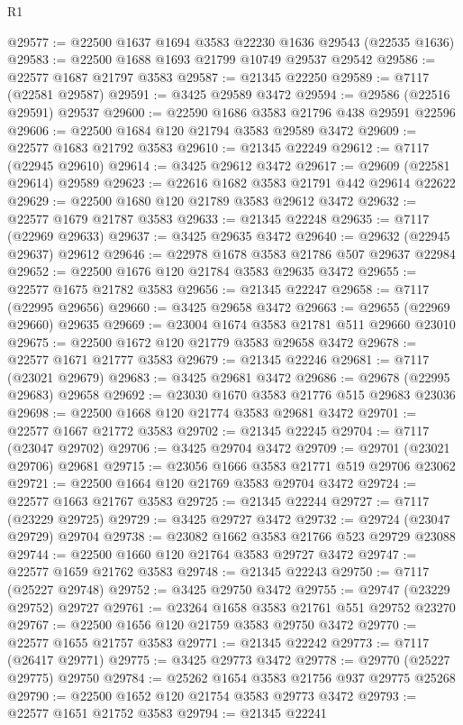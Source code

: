\begin{lexlean}{R1}
\begin{coremodule}
@29577 := @22500 @1637 @1694 @3583 @22230 @1636 @29543 (@22535 @1636)
@29583 := @22500 @1688 @1693 @21799 @10749 @29537 @29542
@29586 := @22577 @1687 @21797 @3583
@29587 := @21345 @22250
@29589 := @7117 (@22581 @29587)
@29591 := @3425 @29589 @3472
@29594 := @29586 (@22516 @29591) @29537
@29600 := @22590 @1686 @3583 @21796 @438 @29591 @22596
@29606 := @22500 @1684 @120 @21794 @3583 @29589 @3472
@29609 := @22577 @1683 @21792 @3583
@29610 := @21345 @22249
@29612 := @7117 (@22945 @29610)
@29614 := @3425 @29612 @3472
@29617 := @29609 (@22581 @29614) @29589
@29623 := @22616 @1682 @3583 @21791 @442 @29614 @22622
@29629 := @22500 @1680 @120 @21789 @3583 @29612 @3472
@29632 := @22577 @1679 @21787 @3583
@29633 := @21345 @22248
@29635 := @7117 (@22969 @29633)
@29637 := @3425 @29635 @3472
@29640 := @29632 (@22945 @29637) @29612
@29646 := @22978 @1678 @3583 @21786 @507 @29637 @22984
@29652 := @22500 @1676 @120 @21784 @3583 @29635 @3472
@29655 := @22577 @1675 @21782 @3583
@29656 := @21345 @22247
@29658 := @7117 (@22995 @29656)
@29660 := @3425 @29658 @3472
@29663 := @29655 (@22969 @29660) @29635
@29669 := @23004 @1674 @3583 @21781 @511 @29660 @23010
@29675 := @22500 @1672 @120 @21779 @3583 @29658 @3472
@29678 := @22577 @1671 @21777 @3583
@29679 := @21345 @22246
@29681 := @7117 (@23021 @29679)
@29683 := @3425 @29681 @3472
@29686 := @29678 (@22995 @29683) @29658
@29692 := @23030 @1670 @3583 @21776 @515 @29683 @23036
@29698 := @22500 @1668 @120 @21774 @3583 @29681 @3472
@29701 := @22577 @1667 @21772 @3583
@29702 := @21345 @22245
@29704 := @7117 (@23047 @29702)
@29706 := @3425 @29704 @3472
@29709 := @29701 (@23021 @29706) @29681
@29715 := @23056 @1666 @3583 @21771 @519 @29706 @23062
@29721 := @22500 @1664 @120 @21769 @3583 @29704 @3472
@29724 := @22577 @1663 @21767 @3583
@29725 := @21345 @22244
@29727 := @7117 (@23229 @29725)
@29729 := @3425 @29727 @3472
@29732 := @29724 (@23047 @29729) @29704
@29738 := @23082 @1662 @3583 @21766 @523 @29729 @23088
@29744 := @22500 @1660 @120 @21764 @3583 @29727 @3472
@29747 := @22577 @1659 @21762 @3583
@29748 := @21345 @22243
@29750 := @7117 (@25227 @29748)
@29752 := @3425 @29750 @3472
@29755 := @29747 (@23229 @29752) @29727
@29761 := @23264 @1658 @3583 @21761 @551 @29752 @23270
@29767 := @22500 @1656 @120 @21759 @3583 @29750 @3472
@29770 := @22577 @1655 @21757 @3583
@29771 := @21345 @22242
@29773 := @7117 (@26417 @29771)
@29775 := @3425 @29773 @3472
@29778 := @29770 (@25227 @29775) @29750
@29784 := @25262 @1654 @3583 @21756 @937 @29775 @25268
@29790 := @22500 @1652 @120 @21754 @3583 @29773 @3472
@29793 := @22577 @1651 @21752 @3583
@29794 := @21345 @22241

\end{coremodule}
\end{lexlean}
